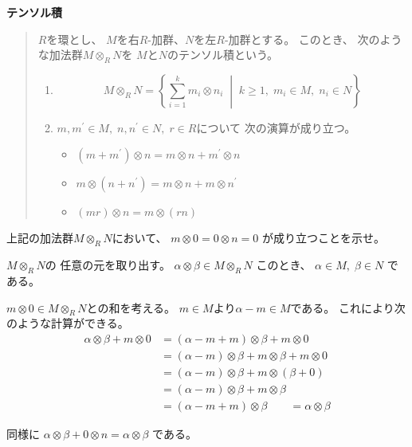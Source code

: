 \documentclass[12pt,b5paper]{ltjsarticle}
\begin{document}
\hrulefill

\newpage

\hrulefill

\textbf{テンソル積}
\begin{quotation}
 $R$を環とし、
 $M$を右$R$-加群、$N$を左$R$-加群とする。
 このとき、
 次のような加法群$M\otimes_{R}N$を
 $M$と$N$のテンソル積という。
 \begin{enumerate}
  \item
       \begin{equation}
        M\otimes_{R}N
         = \left\{ \sum_{i=1}^{k} m_{i}\otimes n_{i} \; \middle| \;
            k\geq 1,\; m_{i} \in M,\; n_{i} \in N
           \right\}
       \end{equation}
  \item
       $m,m^{\prime} \in M,\; n,n^{\prime}\in N,\; r\in R$について
       次の演算が成り立つ。
       \begin{itemize}
        \item $(m+m^{\prime})\otimes n = m\otimes n + m^{\prime}\otimes n$
        \item $m\otimes (n+n^{\prime}) = m\otimes n + m\otimes n^{\prime}$
        \item $(mr)\otimes n = m\otimes (rn)$
       \end{itemize}
 \end{enumerate}
\end{quotation}

上記の加法群$M \otimes_{R} N$において、
$m \otimes 0 = 0\otimes n =0$
が成り立つことを示せ。

\dotfill

$M\otimes_{R}N$の
任意の元を取り出す。
$\alpha\otimes \beta\in M\otimes_{R}N$
このとき、
$\alpha \in M,\;\beta \in N$
である。

$m\otimes 0\in M\otimes_{R}N$との和を考える。
$m\in M$より$\alpha -m\in M$である。
これにより次のような計算ができる。
\begin{align}
 \alpha\otimes \beta + m\otimes 0
  &= (\alpha-m +m)\otimes \beta + m\otimes 0\\
  &= (\alpha-m)\otimes \beta +m\otimes \beta + m\otimes 0\\
  &= (\alpha-m)\otimes \beta +m\otimes (\beta + 0)\\
  &= (\alpha-m)\otimes \beta +m\otimes \beta\\
  &= (\alpha-m +m)\otimes \beta
  \qquad = \alpha\otimes \beta
\end{align}

同様に
$\alpha\otimes \beta + 0\otimes n = \alpha\otimes \beta$
である。
\end{document}
